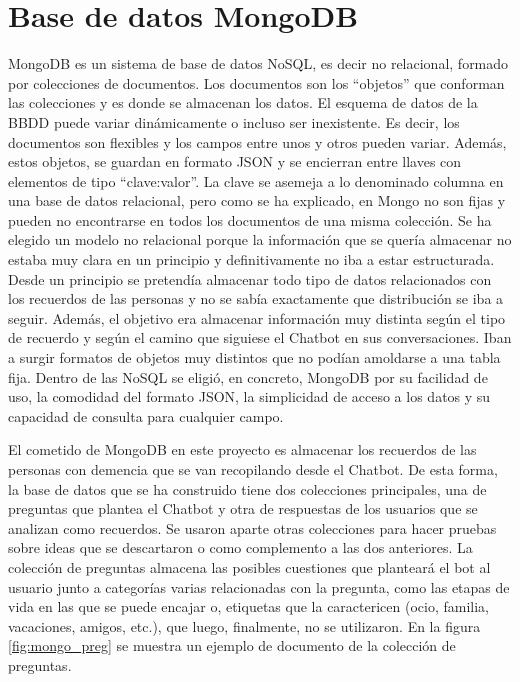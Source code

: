 \section{Base de datos MongoDB}

MongoDB es un sistema de base de datos NoSQL, es decir no relacional, formado por colecciones de documentos. Los documentos son los ``objetos'' que conforman las colecciones y es donde se almacenan los datos. El esquema de datos de la BBDD puede variar dinámicamente o incluso ser inexistente. Es decir, los documentos son flexibles y los campos entre unos y otros pueden variar. Además, estos objetos, se guardan en formato JSON y se encierran entre llaves con elementos de tipo ``clave:valor''. La clave se asemeja a lo denominado columna en una base de datos relacional, pero como se ha explicado, en Mongo no son fijas y pueden no encontrarse en todos los documentos de una misma colección. Se ha elegido un modelo no relacional porque la información que se quería almacenar no estaba muy clara en un principio y definitivamente no iba a estar estructurada. Desde un principio se pretendía almacenar todo tipo de datos relacionados con los recuerdos de las personas y no se sabía exactamente que distribución se iba a seguir. Además, el objetivo era almacenar información muy distinta según el tipo de recuerdo y según el camino que siguiese el Chatbot en sus conversaciones. Iban a surgir formatos de objetos muy distintos que no podían amoldarse a una tabla fija. Dentro de las NoSQL se eligió, en concreto, MongoDB por su facilidad de uso, la comodidad del formato JSON, la simplicidad de acceso a los datos y su capacidad de consulta para cualquier campo. 

El cometido de MongoDB en este proyecto es almacenar los recuerdos de las personas con demencia que se van recopilando desde el Chatbot. De esta forma, la base de datos que se ha construido tiene dos colecciones principales, una de preguntas que plantea el Chatbot y otra de respuestas de los usuarios que se analizan como recuerdos. Se usaron aparte otras colecciones para hacer pruebas sobre ideas que se descartaron o como complemento a las dos anteriores. La colección de preguntas almacena las posibles cuestiones que planteará el bot al usuario junto a categorías varias relacionadas con la pregunta, como las etapas de vida en las que se puede encajar o, etiquetas que la caractericen (ocio, familia, vacaciones, amigos, etc.), que luego, finalmente, no se utilizaron. En la figura \ref{fig:mongo_preg} se muestra un ejemplo de documento de la colección de preguntas.

